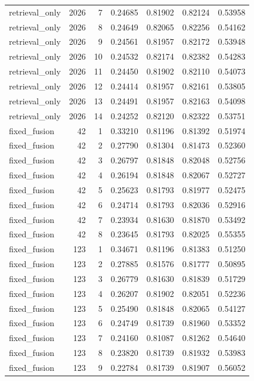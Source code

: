 \begin{tabular}{lrrrrrr}
retrieval_only & 2026 & 7 & 0.24685 & 0.81902 & 0.82124 & 0.53958 \\
retrieval_only & 2026 & 8 & 0.24649 & 0.82065 & 0.82256 & 0.54162 \\
retrieval_only & 2026 & 9 & 0.24561 & 0.81957 & 0.82172 & 0.53948 \\
retrieval_only & 2026 & 10 & 0.24532 & 0.82174 & 0.82382 & 0.54283 \\
retrieval_only & 2026 & 11 & 0.24450 & 0.81902 & 0.82110 & 0.54073 \\
retrieval_only & 2026 & 12 & 0.24414 & 0.81957 & 0.82161 & 0.53805 \\
retrieval_only & 2026 & 13 & 0.24491 & 0.81957 & 0.82163 & 0.54098 \\
retrieval_only & 2026 & 14 & 0.24252 & 0.82120 & 0.82322 & 0.53751 \\
fixed_fusion & 42 & 1 & 0.33210 & 0.81196 & 0.81392 & 0.51974 \\
fixed_fusion & 42 & 2 & 0.27790 & 0.81304 & 0.81473 & 0.52360 \\
fixed_fusion & 42 & 3 & 0.26797 & 0.81848 & 0.82048 & 0.52756 \\
fixed_fusion & 42 & 4 & 0.26194 & 0.81848 & 0.82067 & 0.52727 \\
fixed_fusion & 42 & 5 & 0.25623 & 0.81793 & 0.81977 & 0.52475 \\
fixed_fusion & 42 & 6 & 0.24714 & 0.81793 & 0.82036 & 0.52916 \\
fixed_fusion & 42 & 7 & 0.23934 & 0.81630 & 0.81870 & 0.53492 \\
fixed_fusion & 42 & 8 & 0.23645 & 0.81793 & 0.82025 & 0.55355 \\
fixed_fusion & 123 & 1 & 0.34671 & 0.81196 & 0.81383 & 0.51250 \\
fixed_fusion & 123 & 2 & 0.27885 & 0.81576 & 0.81777 & 0.50895 \\
fixed_fusion & 123 & 3 & 0.26779 & 0.81630 & 0.81839 & 0.51729 \\
fixed_fusion & 123 & 4 & 0.26207 & 0.81902 & 0.82051 & 0.52236 \\
fixed_fusion & 123 & 5 & 0.25490 & 0.81848 & 0.82065 & 0.54127 \\
fixed_fusion & 123 & 6 & 0.24749 & 0.81739 & 0.81960 & 0.53352 \\
fixed_fusion & 123 & 7 & 0.24160 & 0.81087 & 0.81262 & 0.54640 \\
fixed_fusion & 123 & 8 & 0.23820 & 0.81739 & 0.81932 & 0.53983 \\
fixed_fusion & 123 & 9 & 0.22784 & 0.81739 & 0.81907 & 0.56052 \\

\end{tabular}
